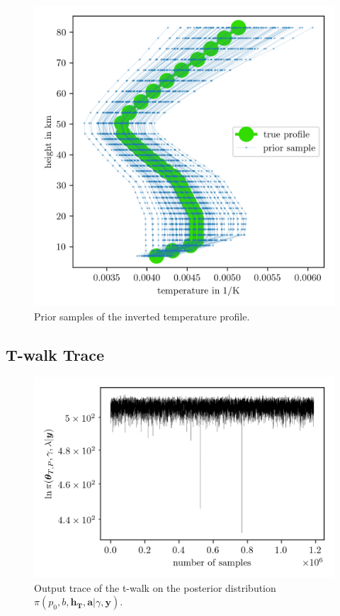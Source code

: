 \begin{figure}[ht!]
	\centering
	\includegraphics{PriorOverTempPost.png}
	\caption[Prior samples of $1/\bm{T}$]{Prior samples of the inverted temperature profile.}
	\label{fig:OverTempPrior}
\end{figure}
\subsection{T-walk Trace}
\begin{figure}[ht!]
	\centering
	\includegraphics{TraceTwalk.png}
	\caption[T-walk trace]{Output trace of the t-walk on the posterior distribution $\pi(p_0,b,\bm{h_T},\bm{a}| \gamma,\bm{y})$.}
	\label{fig:TraceTwalk}
\end{figure}


